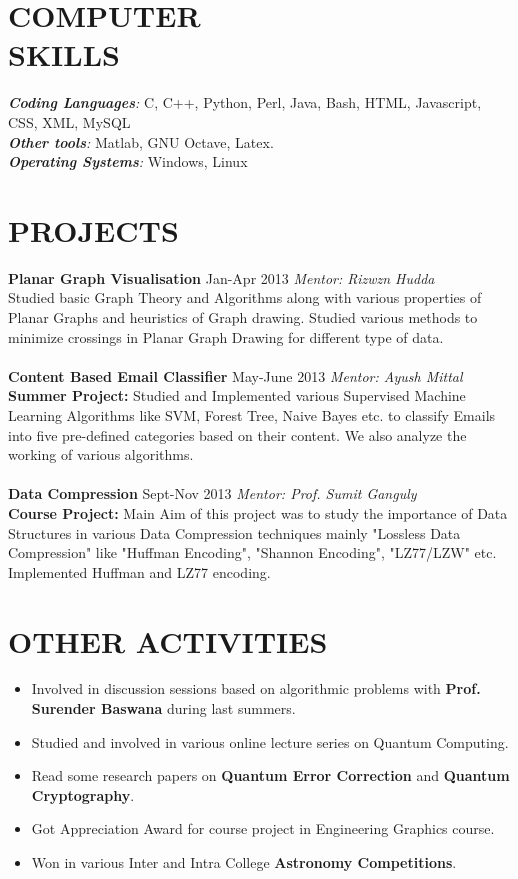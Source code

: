 \documentclass[margin, 10pt]{res} %
\begin{document}
\begin{resume}
\section{COMPUTER \\ SKILLS} 
{\sl {\bf Coding Languages}:} C, C++, Python, Perl, Java, Bash, HTML, Javascript, CSS, XML, MySQL \\
{\sl {\bf Other tools}:} Matlab, GNU Octave, Latex.\\
{\sl {\bf Operating Systems}:} Windows, Linux
\section{PROJECTS}
{\bf Planar Graph Visualisation} \hfill Jan-Apr 2013 \hfill {\sl Mentor: Rizwzn Hudda} \\ 
Studied basic Graph Theory and Algorithms along with various properties of Planar Graphs and heuristics of Graph drawing. Studied various methods to minimize crossings in Planar Graph Drawing for different type of data.\\\\
{\bf Content Based Email Classifier} \hfill May-June 2013 \hfill {\sl Mentor: Ayush Mittal} \\
{\bf Summer Project:} Studied and Implemented various Supervised Machine Learning Algorithms like SVM, Forest Tree, Naive Bayes etc. to classify Emails into five pre-defined categories based on their content. We also analyze the working of various algorithms. \\\\
{\bf Data Compression} \hfill Sept-Nov 2013 \hfill {\sl Mentor: Prof. Sumit Ganguly}\\
{\bf Course Project:} Main Aim of this project was to study the importance of Data Structures in various Data Compression techniques mainly "Lossless Data Compression" like "Huffman Encoding", "Shannon Encoding", "LZ77/LZW" etc. Implemented Huffman and LZ77 encoding.\\
\section{OTHER ACTIVITIES}
\begin{itemize}
\item Involved in discussion sessions based on algorithmic problems with {\bf Prof. Surender Baswana} during last summers.
\item Studied and involved in various online lecture series on Quantum Computing.
\item Read some research papers on {\bf Quantum Error Correction} and {\bf Quantum Cryptography}.
\item Got Appreciation Award for course project in Engineering Graphics course.
\item Won in various Inter and Intra College {\bf Astronomy Competitions}.
\end{itemize}

\end{resume}
\end{document}
